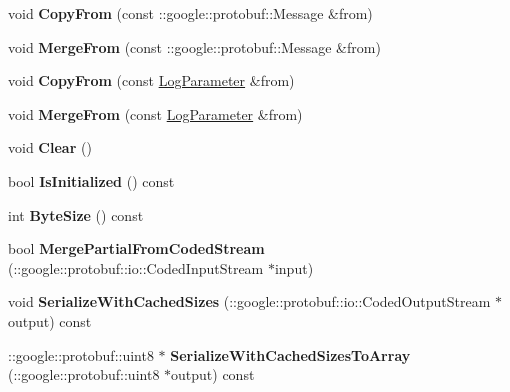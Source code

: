 \begin{DoxyCompactItemize}
void {\bfseries Copy\+From} (const \+::google\+::protobuf\+::\+Message \&from)
\item 
\mbox{\label{classcaffe_1_1_log_parameter_a540eb5949b28d2dafe7d9c0cc92f05cd}} 
void {\bfseries Merge\+From} (const \+::google\+::protobuf\+::\+Message \&from)
\item 
\mbox{\label{classcaffe_1_1_log_parameter_a06993a9a42b89ac4a127c751d7b431c7}} 
void {\bfseries Copy\+From} (const \mbox{\hyperlink{classcaffe_1_1_log_parameter}{Log\+Parameter}} \&from)
\item 
\mbox{\label{classcaffe_1_1_log_parameter_acc46f9d1b6e0308fec6ec8b1ad9a02c9}} 
void {\bfseries Merge\+From} (const \mbox{\hyperlink{classcaffe_1_1_log_parameter}{Log\+Parameter}} \&from)
\item 
\mbox{\label{classcaffe_1_1_log_parameter_a8bc12d70e742c9edcd62342bff75d67a}} 
void {\bfseries Clear} ()
\item 
\mbox{\label{classcaffe_1_1_log_parameter_a61a4eaeb0397f2a96d93ec3797a61379}} 
bool {\bfseries Is\+Initialized} () const
\item 
\mbox{\label{classcaffe_1_1_log_parameter_a2c00b06bae6b98f47dc31e87ad4330cf}} 
int {\bfseries Byte\+Size} () const
\item 
\mbox{\label{classcaffe_1_1_log_parameter_a6f8db5a31f896f9e9c0178553e0b31e0}} 
bool {\bfseries Merge\+Partial\+From\+Coded\+Stream} (\+::google\+::protobuf\+::io\+::\+Coded\+Input\+Stream $\ast$input)
\item 
\mbox{\label{classcaffe_1_1_log_parameter_a7786e8ad372b62629ff3de86c3b9a736}} 
void {\bfseries Serialize\+With\+Cached\+Sizes} (\+::google\+::protobuf\+::io\+::\+Coded\+Output\+Stream $\ast$output) const
\item 
\mbox{\label{classcaffe_1_1_log_parameter_a6b13058b0fe3cb65545a82f157893c1a}} 
\+::google\+::protobuf\+::uint8 $\ast$ {\bfseries Serialize\+With\+Cached\+Sizes\+To\+Array} (\+::google\+::protobuf\+::uint8 $\ast$output) const

\end{DoxyCompactItemize}
